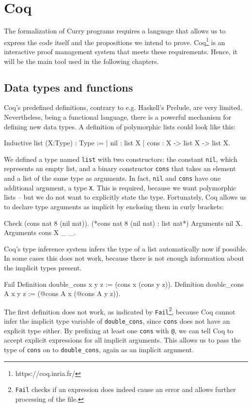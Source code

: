 \documentclass[fleqn, abstract=on]{scrreprt}
\newcommand{\todo}[1]{\marginpar{\textbf{TODO:} #1}}
\newcommand{\coqinline}[1]{\texttt{#1}}
\begin{document}
\section{Coq}
The formalization of Curry programs requires a language that allows us to express the code itself and the propositions we intend to prove. Coq\footnote{https://coq.inria.fr/} is an interactive proof management system that meets these requirements. Hence, it will be the main tool used in the following chapters. \cite{Pierce:SF}
\todo{Kommasetzung?}
\subsection{Data types and functions}
Coq's predefined definitions, contrary to e.g. Haskell's Prelude, are very limited. Nevertheless, being a functional language, there is a powerful mechanism for defining new data types. A definition of polymorphic lists could look like this:
\begin{coqcode}
Inductive list (X:Type) : Type :=
  | nil  : list X
  | cons : X -> list X -> list X.
\end{coqcode}
We defined a type named \coqinline{list} with two constructors: the constant \coqinline{nil}, which represents an empty list, and a binary constructor \coqinline{cons} that takes an element and a list of the same type as arguments. In fact, \coqinline{nil} and \coqinline{cons} have one additional argument, a type \coqinline{X}. This is required, because we want polymorphic lists -- but we do not want to explicitly state the type. Fortunately, Coq allows us to declare type arguments as implicit by enclosing them in curly brackets:
\begin{coqcode}
Check (cons nat 8 (nil nat)). (*cons nat 8 (nil nat) : list nat*)
Arguments nil {X}.
Arguments cons {X} _ _.
\end{coqcode}
Coq's type inference system infers the type of a list automatically now if possible. In some cases this does not work, because there is not enough information about the implicit types present. 
\begin{coqcode}
Fail Definition double_cons x y z := (cons x (cons y z)).
Definition double_cons {A} x y z := (@cons A x (@cons A y z)).
\end{coqcode}
The first definition does not work, as indicated by \coqinline{Fail}\footnote{\coqinline{Fail} checks if an expression does indeed cause an error and allows further processing of the file.}, because Coq cannot infer the implicit type variable of \coqinline{double_cons}, since \coqinline{cons} does not have an explicit type either. By prefixing at least one \coqinline{cons} with \coqinline{@}, we can tell Coq to accept explicit expressions for all implicit arguments. This allows us to pass the type of \coqinline{cons} on to \coqinline{double_cons}, again as an implicit argument.
\end{document}
